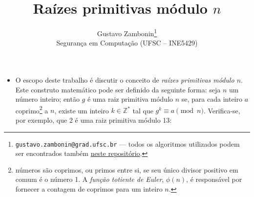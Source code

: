 \documentclass{article}
\title{\textbf{Raízes primitivas módulo $n$}}
\author{Gustavo Zambonin\thanks{\texttt{gustavo.zambonin@grad.ufsc.br} ---
todos os algoritmos utilizados podem ser encontrados
também \href{https://github.com/zambonin/ufsc-ine5429}{neste repositório}.} \\
\small {Segurança em Computação (UFSC -- INE5429)} \vspace{-5mm}}
\date{}
\begin{document}
\maketitle

\begin{itemize}

\item O escopo deste trabalho é discutir o conceito de \emph{raízes primitivas
módulo $n$}. Este construto matemático pode ser definido da seguinte forma: seja
$n$ um número inteiro; então $g$ é uma raiz primitiva módulo $n$ se, para cada
inteiro $a$ coprimo\footnote{números são coprimos, ou primos entre si, se seu
único divisor positivo em comum é o número 1. A \emph{função totiente de Euler},
$\phi(n)$, é responsável por fornecer a contagem de coprimos para um inteiro
$n$.} a $n$, existe um inteiro $k \in \mathbb{Z}^*$ tal que $g^k \equiv a \pmod
n$. Verifica-se, por exemplo, que 2 é uma raiz primitiva módulo 13:


\end{itemize}
\end{document}
